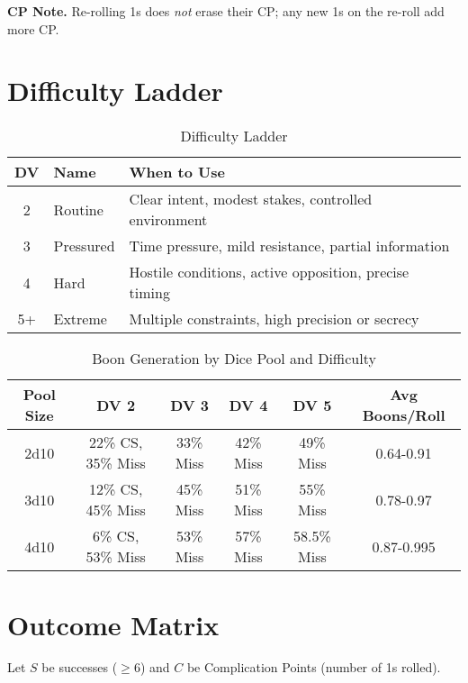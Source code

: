 \noindent\textbf{CP Note.} Re-rolling 1s does \emph{not} erase their CP; any new 1s on the re-roll add more CP.

\section{Difficulty Ladder}

\begin{table}[htbp]
\centering
\begin{tabular}{cll}
\toprule
\textbf{DV} & \textbf{Name} & \textbf{When to Use} \\
\midrule
2 & Routine & Clear intent, modest stakes, controlled environment \\
3 & Pressured & Time pressure, mild resistance, partial information \\
4 & Hard & Hostile conditions, active opposition, precise timing \\
5+ & Extreme & Multiple constraints, high precision or secrecy \\
\bottomrule
\end{tabular}
\caption{Difficulty Ladder}
\end{table}

\begin{table}[htbp]
\centering
\caption{Boon Generation by Dice Pool and Difficulty}
\begin{tabular}{|c|c|c|c|c|c|}
\hline
\textbf{Pool Size} & \textbf{DV 2} & \textbf{DV 3} & \textbf{DV 4} & \textbf{DV 5} & \textbf{Avg Boons/Roll} \\
\hline
2d10 & 22\% CS, 35\% Miss & 33\% Miss & 42\% Miss & 49\% Miss & 0.64-0.91 \\
3d10 & 12\% CS, 45\% Miss & 45\% Miss & 51\% Miss & 55\% Miss & 0.78-0.97 \\
4d10 & 6\% CS, 53\% Miss & 53\% Miss & 57\% Miss & 58.5\% Miss & 0.87-0.995 \\
\hline
\end{tabular}
\end{table}

\section{Outcome Matrix}

Let $S$ be successes ($\geq 6$) and $C$ be Complication Points (number of 1s rolled).

